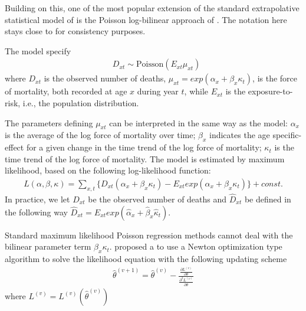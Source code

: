 \documentclass[AER, draftmode]{AEA}
\begin{document}
Building on this, one of the most popular extension of the standard extrapolative statistical model of \cite{Lee1992} is the Poisson log-bilinear approach of \cite{Brouhns2002}. The notation here stays close to \cite{Brouhns2002} for consistency purposes.

The model specify
\begin{align}
&D_{xt}\sim\text{Poisson}(E_{xt}\mu_{xt})
\end{align}
where $D_{xt}$ is the observed number of deaths, $\mu_{xt}=exp(\alpha_x+\beta_x\kappa_t)$, is the force of mortality, both recorded at age $x$ during year $t$, while $E_{xt}$ is the exposure-to-risk, i.e., the population distribution. 

The parameters defining $\mu_{xt}$ can be interpreted in the same way as the \cite{Lee1992} model: $\alpha_x$ is the average of the log force of mortality over time; $\beta_x$ indicates the age specific-effect for a given change in the time trend of the log force of mortality; $\kappa_t$ is the time trend of the log force of mortality. The model is estimated by maximum likelihood, based on the following log-likelihood function:
\begin{align}
L(\alpha,\beta,\kappa)=\sum_{x,t}\{D_{xt}(\alpha_x+\beta_x\kappa_t)-E_{xt}exp(\alpha_x+\beta_x\kappa_t)\}+const.
\end{align}
In practice, we let $D_{xt}$ be the observed number of deaths and $\hat{D}_{xt}$ be defined in the following way $\hat{D}_{xt}=E_{xt}exp(\hat{\alpha}_x+\hat{\beta}_x\hat{\kappa}_t)$. 

Standard maximum likelihood Poisson regression methods cannot deal with the bilinear parameter term $\beta_x\kappa_t$. \cite{Goodman1979} proposed a to use a Newton optimization type algorithm to solve the likelihood equation with the following updating scheme
\begin{align}
	\hat{\theta}^{(v+1)}=\hat{\theta}^{(v)}  - \frac{\frac{\partial L^{(v)}}{\partial \theta}}
	{\frac{\partial^2 L^{(v)}}{\partial \theta}}
\end{align}
where $L^{(v)} = L^{(v)}(\hat{\theta}^{(v)})$
\end{document}
